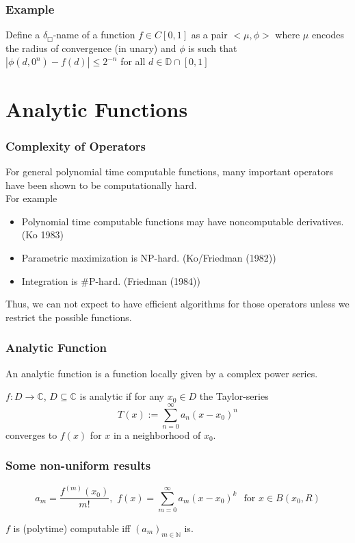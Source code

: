 \documentclass[xcolor=pdftex,dvipsnames,table,handout]{beamer}
\newcommand{\N}{\ensuremath{\mathbb{N}}}
\newcommand{\C}{\ensuremath{\mathbb{C}}}
\newcommand{\D}{\ensuremath{\mathbb{D}}}
\newcommand{\abs}[1]{\left|#1\right|}
\begin{document}
\begin{frame}
  \frametitle{Example}
  Define a $\delta_\Box$-name of a function $f \in C[0,1]$ as a pair $<\mu, \phi>$ where $\mu$ encodes the radius of convergence (in unary) and $\phi$ is such that $\abs{\phi(d, 0^n)-f(d)} \leq 2^{-n}$ for all $d \in \D \cap [0,1]$
  \end{frame}
\section{Analytic Functions}
\begin{frame}
\frametitle{Complexity of Operators}
\begin{fact}
For general polynomial time computable functions, many important operators have been shown to be computationally hard.\\
For example
\pause
\begin{itemize}[<+->]
\item Polynomial time computable functions may have noncomputable derivatives. (Ko 1983)
\item Parametric maximization is NP-hard. (Ko/Friedman (1982))
\item Integration is \#P-hard. (Friedman (1984))
\end{itemize}
\end{fact}
\pause
Thus, we can not expect to have efficient algorithms for those operators unless we restrict the possible functions.
\end{frame}
\begin{frame}
\frametitle{Analytic Function}
An analytic function is a function locally given by a complex power series.\\
\begin{definition}
$f : D \to \C $, $D \subseteq \C$ is analytic if for any $x_0 \in D$ the Taylor-series
$$ T(x) := \sum^\infty_{n=0} a_n(x-x_0)^n$$
converges to $f(x)$ for $x$ in a neighborhood of $x_0$.  
\end{definition}
\end{frame}
\begin{frame}
\frametitle{Some non-uniform results}

$$a_m =\frac{f^{(m)}(x_0)}{m!} 
, \,\, f(x) = \sum_{m=0}^\infty a_m(x-x_0)^k \,\ \text{ for } x \in B(x_0,R)
$$
\vfill
\begin{theorem}
$f$ is (polytime) computable iff $(a_m)_{m \in \N}$ is.
\end{theorem}
\end{frame}
\end{document}
